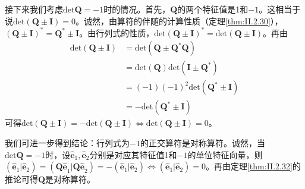\documentclass[main.tex]{subfiles}
\begin{document}
接下来我们考虑$\mathrm{det}\mathbf{Q}=-1$时的情况。首先，$\mathbf{Q}$的两个特征值是1和$-1$。这相当于说$\mathrm{det}\left(\mathbf{Q}\pm\mathbf{I}\right)=0$。诚然，由算符的伴随的计算性质（定理\ref{thm:II.2.30}），$\left(\mathbf{Q}\pm\mathbf{I}\right)^*=\mathbf{Q}^*\pm\mathbf{I}$。由行列式的性质，$\mathrm{det}\left(\mathbf{Q}\pm\mathbf{I}\right)^*=\mathrm{det}\left(\mathbf{Q}\pm\mathbf{I}\right)$。再由
\begin{align*}
    \mathrm{det}\left(\mathbf{Q}\pm\mathbf{I}\right) & =\mathrm{det}\left(\mathbf{Q}\pm\mathbf{Q}^*\mathbf{Q}\right)                          \\
                                                     & =\mathrm{det}\left(\mathbf{Q}\right)\mathrm{det}\left(\mathbf{I}\pm\mathbf{Q}^*\right) \\
                                                     & =\left(-1\right)\left(-1\right)^2\mathrm{det}\left(\mathbf{Q}^*\pm\mathbf{I}\right)    \\
                                                     & =-\mathrm{det}\left(\mathbf{Q}^*\pm\mathbf{I}\right)
\end{align*}
可得$\mathrm{det}\left(\mathbf{Q}\pm\mathbf{I}\right)=-\mathrm{det}\left(\mathbf{Q}\pm\mathbf{I}\right)\Leftrightarrow\mathrm{det}\left(\mathbf{Q}\pm\mathbf{I}\right)=0$。

我们可进一步得到结论：行列式为$-1$的正交算符是对称算符。诚然，当$\mathrm{det}\mathbf{Q}=-1$时，设$\mathbf{\hat{e}}_1,\mathbf{\hat{e}}_2$分别是对应其特征值1和$-1$的单位特征向量，则$\left(\mathbf{\hat{e}}_1|\mathbf{\hat{e}}_2\right)=\left(\mathbf{Q\hat{e}}_1|\mathbf{Q\hat{e}}_2\right)=-\left(\mathbf{\hat{e}}_1|\mathbf{\hat{e}}_2\right)\Leftrightarrow\left(\mathbf{\hat{e}}_1|\mathbf{\hat{e}}_2\right)=0$。再由定理\ref{thm:II.2.32}的推论可得$\mathbf{Q}$是对称算符。
\end{document}
